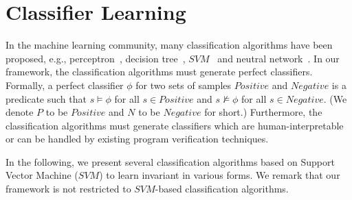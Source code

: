 \section{Classifier Learning}
\label{sec:classifierlearning}

In the machine learning community, many classification algorithms have been proposed, 
e.g., perceptron~\cite{perceptron}, decision tree~\cite{quinlan1986induction}, $\mathit{SVM}$~\cite{svm:original} and neutral network~\cite{nn}.
In our framework, the classification algorithms must generate perfect classifiers. 
Formally, a perfect classifier $\phi$ for two sets of samples $Positive$ and $Negative$ is a predicate 
such that $s \models \phi$ for all $\mathit{s \in Positive}$ and $\mathit{s \not \models \phi}$ for all $\mathit{s \in Negative}$. 
(We denote $P$ to be $\mathit{Positive}$ and $N$ to be $\mathit{Negative}$ for short.) 
Furthermore, the classification algorithms must generate classifiers which are human-interpretable or can be handled by existing program verification techniques. 

In the following, we present several classification algorithms based on Support Vector Machine ($\mathit{SVM}$) to learn invariant in various forms. 
We remark that our framework is not restricted to $\mathit{SVM}$-based classification algorithms.

